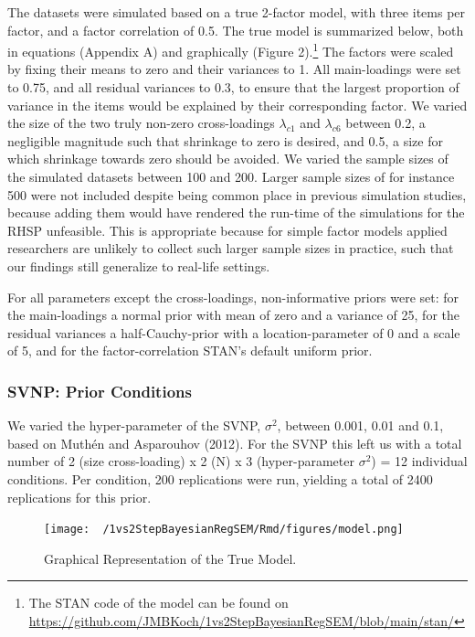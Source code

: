 \documentclass[
  man, donotrepeattitle,floatsintext]{apa6}
\begin{document}
The datasets were simulated based on a true 2-factor model, with three items per factor, and a factor correlation of 0.5. The true model is summarized below, both in equations (Appendix A) and graphically (Figure 2).\footnote{The STAN code of the model can be found on \url{https://github.com/JMBKoch/1vs2StepBayesianRegSEM/blob/main/stan/}} The factors were scaled by fixing their means to zero and their variances to 1. All main-loadings were set to 0.75, and all residual variances to 0.3, to ensure that the largest proportion of variance in the items would be explained by their corresponding factor. We varied the size of the two truly non-zero cross-loadings \(\lambda_{c 1}\) and \(\lambda_{c 6}\) between 0.2, a negligible magnitude such that shrinkage to zero is desired, and 0.5, a size for which shrinkage towards zero should be avoided. We varied the sample sizes of the simulated datasets between 100 and 200. Larger sample sizes of for instance 500 were not included despite being common place in previous simulation studies, because adding them would have rendered the run-time of the simulations for the RHSP unfeasible. This is appropriate because for simple factor models applied researchers are unlikely to collect such larger sample sizes in practice, such that our findings still generalize to real-life settings.

For all parameters except the cross-loadings, non-informative priors were set: for the main-loadings a normal prior with mean of zero and a variance of 25, for the residual variances a half-Cauchy-prior with a location-parameter of 0 and a scale of 5, and for the factor-correlation STAN's default uniform prior.

\hypertarget{svnp-prior-conditions}{%
\subsubsection{SVNP: Prior Conditions}\label{svnp-prior-conditions}}

We varied the hyper-parameter of the SVNP, \(\sigma^2\), between 0.001, 0.01 and 0.1, based on Muthén and Asparouhov (2012). For the SVNP this left us with a total number of 2 (size cross-loading) x 2 (N) x 3 (hyper-parameter \(\sigma^2\)) = 12 individual conditions. Per condition, 200 replications were run, yielding a total of 2400 replications for this prior.

\begin{figure}
\centering
\texttt{[image: ~/1vs2StepBayesianRegSEM/Rmd/figures/model.png]}
\caption{Graphical Representation of the True Model.}
\end{figure}
\end{document}
